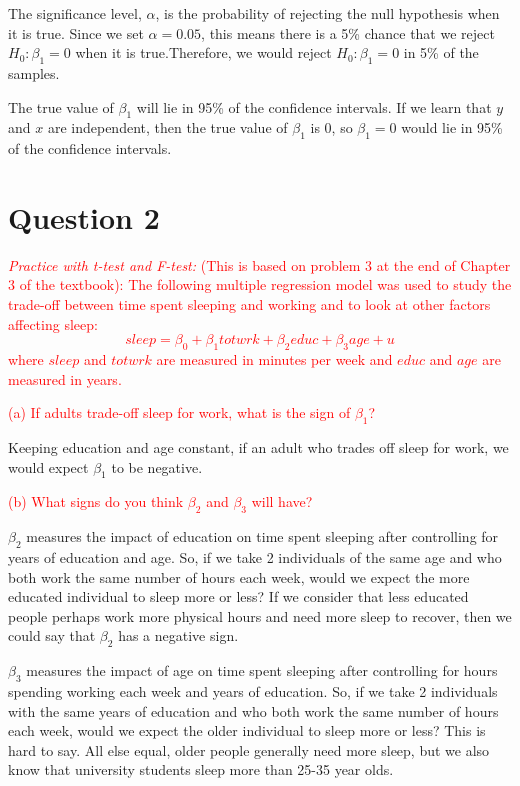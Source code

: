 \documentclass[12pt]{report}
\begin{document}
\noindent The significance level, $\alpha$, is the probability of rejecting the null hypothesis when it is true. Since we set $\alpha = 0.05$, this means there is a 5\% chance that we reject $H_0: \beta_1=0$ when it is true.Therefore, we would reject $H_0: \beta_1=0$ in 5\% of the samples.

\noindent The true value of $\beta_1$ will lie in 95\% of the confidence intervals. If we learn that $y$ and $x$ are independent, then the true value of $\beta_1$ is $0$, so $\beta_1 = 0$ would lie in 95\% of the confidence intervals.

\newpage
\section*{Question 2}
\noindent \textcolor{red}{\textit{Practice with t-test and F-test:} (This is based on problem 3 at the end of Chapter 3 of the textbook): The following multiple regression model was used to study the trade-off between time spent sleeping and working and to look at other factors affecting sleep: $$sleep = \beta_0 + \beta_1 totwrk + \beta_2 educ + \beta_3 age + u$$ where $sleep$ and $totwrk$ are measured in minutes per week and $educ$ and $age$ are measured in years.}

\noindent \textcolor{red}{(a) If adults trade-off sleep for work, what is the sign of $\beta_1$?}

\noindent Keeping education and age constant, if an adult who trades off sleep for work, we would expect $\beta_1$ to be negative.

\noindent \textcolor{red}{(b) What signs do you think $\beta_2$ and $\beta_3$ will have?}

\noindent $\beta_2$ measures the impact of education on time spent sleeping after controlling for years of education and age. So, if we take 2 individuals of the same age and who both work the same number of hours each week, would we expect the more educated individual to sleep more or less? If we consider that less educated people perhaps work more physical hours and need more sleep to recover, then we could say that $\beta_2$ has a negative sign.

\noindent $\beta_3$ measures the impact of age on time spent sleeping after controlling for hours spending working each week and years of education. So, if we take 2 individuals with the same years of education and who both work the same number of hours each week, would we expect the older individual to sleep more or less? This is hard to say. All else equal, older people generally need more sleep, but we also know that university students sleep more than 25-35 year olds.
\end{document}
